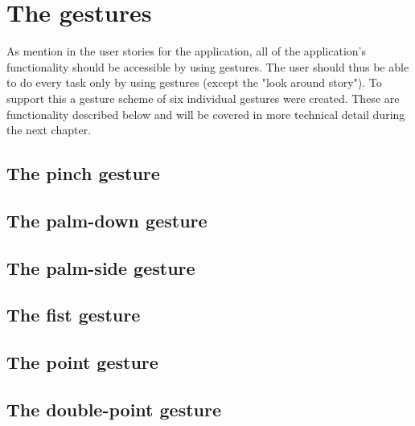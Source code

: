 \section{The gestures}
As mention in the user stories for the application, all of the application's functionality should be accessible by using gestures. The user should thus
be able to do every task only by using gestures (except the "look around story"). To support this a gesture scheme of six individual 
gestures were created. These are functionality described below and will be covered in more technical detail during the next chapter.
 
\subsection{The pinch gesture}
\subsection{The palm-down gesture}
\subsection{The palm-side gesture}
\subsection{The fist gesture}
\subsection{The point gesture}
\subsection{The double-point gesture}